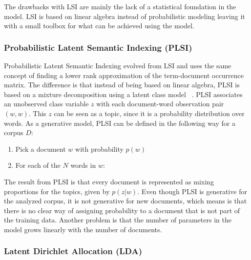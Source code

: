 \documentclass[12pt]{report}
\begin{document}
The drawbacks with LSI are mainly the lack of a statistical foundation in the
model. LSI is based on linear algebra instead of probabilistic modeling leaving
it with a small toolbox for what can be achieved using the model.
	

\subsubsection{Probabilistic Latent Semantic Indexing (PLSI)}


Probabilistic Latent Semantic Indexing evolved from LSI and uses the same
concept of finding a lower rank approximation of the term-document occurrence
matrix. The difference is that instead of being based on linear algebra, PLSI
is based on a mixture decomposition using a latent class model 
~\cite{Hofmann:1999:PLS:312624.312649}. PLSI associates
an unobserved class variable $z$ with each document-word observation pair $(w,
w)$. This $z$ can be seen as a topic, since it is a probability distribution
over words. As a generative model, PLSI can be defined in the following way for
a corpus $D$:

\begin{enumerate}
\item Pick a document $w$ with probability $p(w)$
\item For each of the $N$ words in $w$:
\end{enumerate}


The result from PLSI is that every document is represented as mixing proportions
for the topics, given by $p(z|w)$. Even though PLSI is generative for the
analyzed corpus, it is not generative for new documents, which means is that
there is no clear way of assigning probability to a document that is not part
of the training data. Another problem is that the number of parameters in the
model grows linearly with the number of documents.


\subsubsection{Latent Dirichlet Allocation (LDA)}
\end{document}
